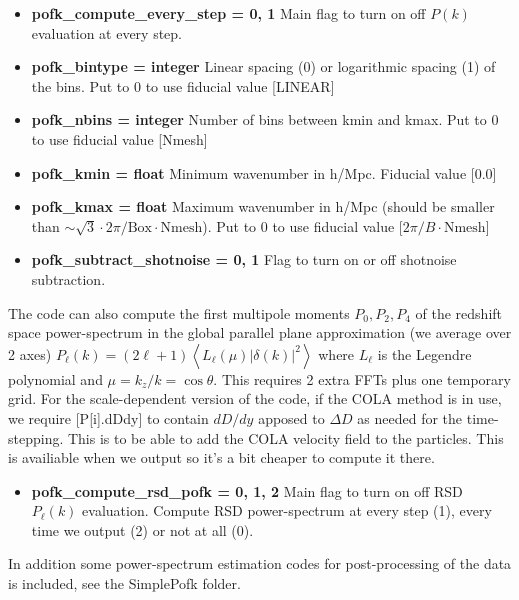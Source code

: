 \documentclass[usenatbib]{article}
\begin{document}
\begin{itemize}

\item \textbf{pofk\_compute\_every\_step = 0, 1} Main flag to turn on off $P(k)$ evaluation at every step.

\item \textbf{pofk\_bintype = integer} Linear spacing (0) or logarithmic spacing (1) of the bins. Put to 0 to use fiducial value [LINEAR]

\item \textbf{pofk\_nbins = integer} Number of bins between kmin and kmax. Put to 0 to use fiducial value [Nmesh]

\item \textbf{pofk\_kmin = float} Minimum wavenumber in h/Mpc. Fiducial value [0.0]

\item \textbf{pofk\_kmax = float} Maximum wavenumber in h/Mpc (should be smaller than $\sim \sqrt{3}\cdot 2\pi/\text{Box}\cdot\text{Nmesh}$). Put to 0 to use fiducial value [$2\pi/B\cdot \text{Nmesh}$]

\item \textbf{pofk\_subtract\_shotnoise = 0, 1} Flag to turn on or off shotnoise subtraction.

\end{itemize}

The code can also compute the first multipole moments $P_0,P_2,P_4$ of the redshift space power-spectrum in the global parallel plane approximation (we average over 2 axes) $P_\ell(k) = (2\ell+1)\left<L_\ell(\mu)|\delta(k)|^2\right>$ where $L_\ell$ is the Legendre polynomial and $\mu = k_z/k = \cos\theta$. This requires 2 extra FFTs plus one temporary grid. For the scale-dependent version of the code, if the COLA method is in use, we require [P[i].dDdy] to contain $dD/dy$ apposed to $\Delta D$ as needed for the time-stepping. This is to be able to add the COLA velocity field to the particles. This is availiable when we output so it's a bit cheaper to compute it there.

\begin{itemize}
\item \textbf{pofk\_compute\_rsd\_pofk = 0, 1, 2} Main flag to turn on off RSD $P_\ell(k)$ evaluation. Compute RSD power-spectrum at every step (1), every time we output (2) or not at all (0).
\end{itemize}

In addition some power-spectrum estimation codes for post-processing of the data is included, see the SimplePofk folder.
\end{document}
